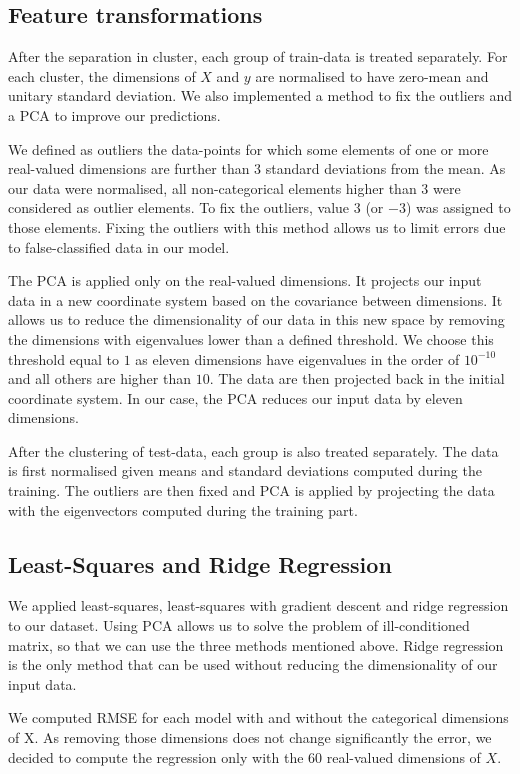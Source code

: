 \documentclass{article} %
\begin{document}
\subsection{Feature transformations}
After the separation in cluster, each group of train-data is treated separately. For each cluster, the dimensions of $X$ and $y$ are normalised to have zero-mean and unitary standard deviation. We also implemented a method to fix the outliers and a PCA to improve our predictions. 

We defined as outliers the data-points for which some elements of one or more real-valued dimensions are further than 3 standard deviations from the mean. As our data were normalised, all non-categorical elements higher than 3 were considered as outlier elements. To fix the outliers, value $3$ (or $-3$) was assigned to those elements. Fixing the outliers with this method allows us to limit errors due to false-classified data in our model.

The PCA is applied only on the real-valued dimensions. It projects our input data in a new coordinate system based on the covariance between dimensions. It allows us to reduce the dimensionality of our data in this new space by removing the dimensions with eigenvalues lower than a defined threshold. We choose this threshold equal to $1$ as eleven dimensions have eigenvalues in the order of $10^{-10}$ and all others are higher than $10$. The data are then projected back in the initial coordinate system. In our case, the PCA reduces our input data by eleven dimensions.

After the clustering of test-data, each group is also treated separately. The data is first normalised given means and standard deviations computed during the training. The outliers are then fixed and PCA is applied by projecting the data with the eigenvectors computed during the training part.

\subsection{Least-Squares and Ridge Regression}
We applied least-squares, least-squares with gradient descent and ridge regression to our dataset. Using PCA allows us to solve the problem of ill-conditioned matrix, so that we can use the three methods mentioned above. Ridge regression is the only method that can be used without reducing the dimensionality of our input data.

We computed RMSE for each model with and without the categorical dimensions of X. As removing those dimensions does not change significantly the error, we decided to compute the regression only with the 60 real-valued dimensions of $X$.
\end{document}
